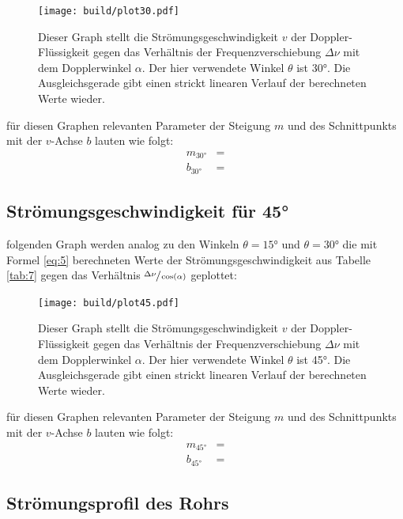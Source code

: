\begin{figure}[H]
    \centering
    \texttt{[image: build/plot30.pdf]}
    \caption{Dieser Graph stellt die Strömungsgeschwindigkeit $v$ der Doppler-Flüssigkeit gegen das Verhältnis der Frequenzverschiebung $\Delta\nu$ mit dem Dopplerwinkel $\alpha$. 
    Der hier verwendete Winkel $\theta$ ist 30°. Die Ausgleichsgerade gibt einen strickt linearen Verlauf der berechneten Werte wieder.}
    \label{fig:6}
\end{figure}

    \justifying für diesen Graphen relevanten Parameter der Steigung $m$ und des Schnittpunkts mit der $v$-Achse $b$ lauten wie folgt:
    \begin{align}
        m_{30°} &= \text{} \label{eq:9}\\
        b_{30°} &= \text{} \label{eq:10}
    \end{align}

\newpage
\subsection{Strömungsgeschwindigkeit für 45°}

    \justifying folgenden Graph werden analog zu den Winkeln $\theta=15°$ und $\theta=30°$ die mit Formel \eqref{eq:5} berechneten Werte der Strömungsgeschwindigkeit 
    aus Tabelle \ref{tab:7} gegen das Verhältnis $\sfrac{\Delta\nu}{\cos(\alpha)}$ geplottet:

\begin{figure}[H]
    \centering
    \texttt{[image: build/plot45.pdf]}
    \caption{Dieser Graph stellt die Strömungsgeschwindigkeit $v$ der Doppler-Flüssigkeit gegen das Verhältnis der Frequenzverschiebung $\Delta\nu$ mit dem Dopplerwinkel $\alpha$. 
    Der hier verwendete Winkel $\theta$ ist 45°. Die Ausgleichsgerade gibt einen strickt linearen Verlauf der berechneten Werte wieder.}
    \label{fig:7}
\end{figure}

    \justifying für diesen Graphen relevanten Parameter der Steigung $m$ und des Schnittpunkts mit der $v$-Achse $b$ lauten wie folgt:
    \begin{align}
        m_{45°} &= \text{} \label{eq:11}\\
        b_{45°} &= \text{} \label{eq:12}
    \end{align}

\newpage
\subsection{Strömungsprofil des Rohrs}

